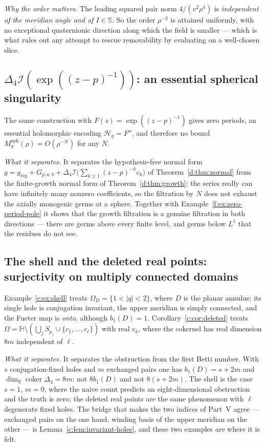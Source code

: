 \documentclass[11pt,a4paper]{article}
\numberwithin{equation}{section}
\theoremstyle{definition}
\theoremstyle{remark}
\theoremstyle{plain}
\newcommand{\HH}{\mathbb H}
\newcommand{\RR}{\mathbb R}
\newcommand{\SSS}{\mathbb S}
\newcommand{\lap}{\Delta_4}
\newcommand{\I}{\mathcal I}
\newcommand{\Om}{\Omega}
\newcommand{\Hg}{\mathcal H_{g}}      %
\newcommand{\Msph}{M^{\mathrm{sph}}}                  %
\newcommand{\abs}[1]{\lvert #1\rvert}
\begin{document}
\emph{Why the order matters.} The leading squared pair norm $4/(v^2\rho^4)$
is \emph{independent of the meridian angle and of $I\in\SSS$}. So the order
$\rho^{-2}$ is attained uniformly, with no exceptional quaternionic
direction along which the field is smaller --- which is what rules out any
attempt to rescue removability by evaluating on a well-chosen slice.

\subsection{$\lap\I(\exp((z-p)^{-1}))$: an essential spherical singularity}
\label{f:ex:essential}

The same construction with $F(z)=\exp((z-p)^{-1})$ gives zero periods, an
essential holomorphic encoding $\Hg=F''$, and therefore no bound
$\Msph_g(\rho)=O(\rho^{-N})$ for any $N$.

\emph{What it separates.} It separates the hypothesis-free normal form
$g=g_{\mathrm{reg}}+G_{p;a,b}+\lap\I\bigl(\sum_{k\ge1}(z-p)^{-k}c_k\bigr)$
of Theorem~\ref{d:thm:normal} from the finite-growth normal form of
Theorem~\ref{d:thm:growth}: the series really can have infinitely many
nonzero coefficients, so the filtration by $N$ does not exhaust the axially
monogenic germs at a sphere. Together with
Example~\ref{f:ex:zero-period-pole} it shows that the growth filtration is
a genuine filtration in both directions --- there are germs above every
finite level, and germs below $L^1$ that the residues do not see.

\subsection{The shell and the deleted real points: surjectivity on
multiply connected domains}
\label{f:ex:shell}

Example~\ref{c:ex:shell} treats $\Om_D=\{1<\abs q<2\}$, where $D$ is the
planar annulus: its single hole is conjugation invariant, the upper
meridian is simply connected, and the Fueter map is \emph{onto}, although
$b_1(D)=1$. Corollary~\ref{c:cor:deleted} treats
$\Om=\HH\setminus(\bigcup_jS_{p_j}\cup\{c_1,\dots,c_\ell\})$ with real
$c_k$, where the cokernel has real dimension $8m$ independent of $\ell$.

\emph{What it separates.} It separates the obstruction from the first Betti
number. With $s$ conjugation-fixed holes and $m$ exchanged pairs one has
$b_1(D)=s+2m$ and $\dim_\RR\operatorname{coker}\lap=8m$: not $8b_1(D)$ and
not $8(s+2m)$. The shell is the case $s=1$, $m=0$, where the naive count
predicts an eight-dimensional obstruction and the truth is zero; the
deleted real points are the same phenomenon with $\ell$ degenerate fixed
holes. The bridge that makes the two indices of Part~V agree ---
exchanged pairs on the one hand, winding basis of the upper meridian on the
other --- is Lemma~\ref{c:lem:invariant-holes}, and these two examples are
where it is felt.
\end{document}
